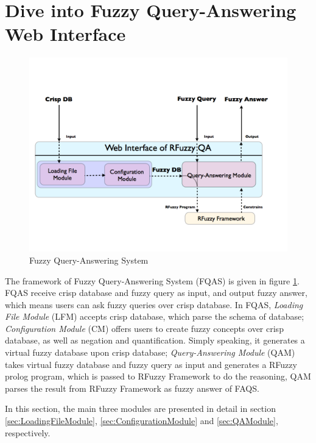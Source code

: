 \documentclass[main.tex]{subfiles}
\begin{document}
\newpage
\section{Dive into Fuzzy Query-Answering Web Interface}
\label{sec:FuzzyQA}
\begin{figure}[htb]
\begin{center}
\includegraphics[scale=0.4]{FQAS.png}
\end{center}
\caption{Fuzzy Query-Answering System}
\label{fig:FQAS}
\end{figure}

The framework of Fuzzy Query-Answering System (FQAS) is given in figure \ref{fig:FQAS}. FQAS receive crisp database and fuzzy query as input, and output fuzzy answer, which means users can ask fuzzy queries over crisp database. In FQAS, \textit{Loading File Module} (LFM) accepts crisp database, which parse the schema of database; \textit{Configuration Module} (CM) offers users to create fuzzy concepts over crisp database, as well as negation and quantification. Simply speaking, it generates a virtual fuzzy database upon crisp database; \textit{Query-Answering Module} (QAM) takes virtual fuzzy database and fuzzy query as input and generates a RFuzzy prolog program, which is passed to RFuzzy Framework to do the reasoning, QAM parses the result from RFuzzy Framework as fuzzy answer of FAQS.

In this section, the main three modules are presented in detail in section \ref{sec:LoadingFileModule}, \ref{sec:ConfigurationModule} and \ref{sec:QAModule}, respectively.



\end{document}
